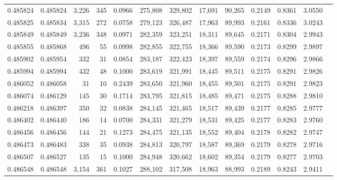 \begin{tabular}{rrrrrrrrrrrrr}
0.485824 & 0.485824 & 3,226 &   345 &                                     0.0966 & 275,808 & 329,802 &  17,691 &  90,265 & 0.2149 & 0.8361 & 3.0550 \\
0.485825 & 0.485834 & 3,315 &   272 &                                     0.0758 & 279,123 & 326,487 &  17,963 &  89,993 & 0.2161 & 0.8336 & 3.0243 \\
0.485849 & 0.485849 & 3,236 &   348 &                                     0.0971 & 282,359 & 323,251 &  18,311 &  89,645 & 0.2171 & 0.8304 & 2.9943 \\
0.485855 & 0.485868 &   496 &    55 &                                     0.0998 & 282,855 & 322,755 &  18,366 &  89,590 & 0.2173 & 0.8299 & 2.9897 \\
0.485902 & 0.485954 &   332 &    31 &                                     0.0854 & 283,187 & 322,423 &  18,397 &  89,559 & 0.2174 & 0.8296 & 2.9866 \\
0.485994 & 0.485994 &   432 &    48 &                                     0.1000 & 283,619 & 321,991 &  18,445 &  89,511 & 0.2175 & 0.8291 & 2.9826 \\
0.486052 & 0.486058 &    31 &    10 &                                     0.2439 & 283,650 & 321,960 &  18,455 &  89,501 & 0.2175 & 0.8291 & 2.9823 \\
0.486074 & 0.486129 &   145 &    30 &                                     0.1714 & 283,795 & 321,815 &  18,485 &  89,471 & 0.2175 & 0.8288 & 2.9810 \\
0.486218 & 0.486397 &   350 &    32 &                                     0.0838 & 284,145 & 321,465 &  18,517 &  89,439 & 0.2177 & 0.8285 & 2.9777 \\
0.486402 & 0.486440 &   186 &    14 &                                     0.0700 & 284,331 & 321,279 &  18,531 &  89,425 & 0.2177 & 0.8283 & 2.9760 \\
0.486456 & 0.486456 &   144 &    21 &                                     0.1273 & 284,475 & 321,135 &  18,552 &  89,404 & 0.2178 & 0.8282 & 2.9747 \\
0.486473 & 0.486483 &   338 &    35 &                                     0.0938 & 284,813 & 320,797 &  18,587 &  89,369 & 0.2179 & 0.8278 & 2.9716 \\
0.486507 & 0.486527 &   135 &    15 &                                     0.1000 & 284,948 & 320,662 &  18,602 &  89,354 & 0.2179 & 0.8277 & 2.9703 \\
0.486548 & 0.486548 & 3,154 &   361 &                                     0.1027 & 288,102 & 317,508 &  18,963 &  88,993 & 0.2189 & 0.8243 & 2.9411 \\

\end{tabular}
